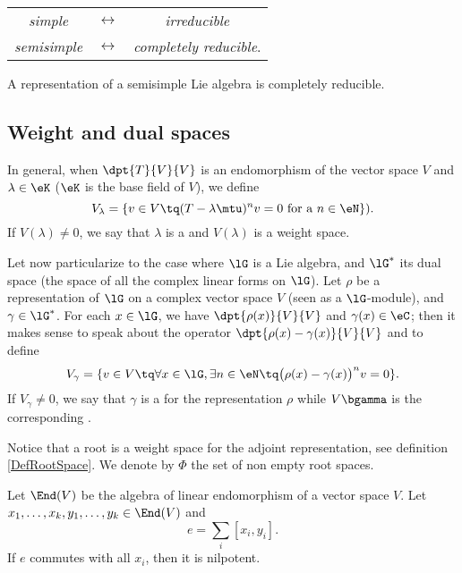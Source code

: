 \begin{center}
\begin{tabular}{ccc}
\emph{simple} & $\leftrightarrow$ & \emph{irreducible} \\ 
\emph{semisimple}& $\leftrightarrow$ &\emph{completely reducible}.\\
\end{tabular} 
\end{center}

\begin{theorem}
A representation of a semisimple Lie algebra is completely reducible.
\end{theorem}

\subsection{Weight and dual spaces}

In general, when $\dpt{T}{V}{V}$ is an endomorphism of the vector space $V$ and $\lambda\in\eK$ ($\eK$ is the base field of $V$), we define
\begin{equation}
V_\lambda=\{ v\in V\tq (T-\lambda\mtu)^nv=0\textrm{ for a $n\in\eN$} \}).
\end{equation}
If $V(\lambda)\neq0$, we say that $\lambda$ is a  and $V(\lambda)$ is a weight space.

Let now particularize to the case where $\lG$ is a Lie algebra, and $\lG^*$ its dual space (the space of all the complex linear forms on $\lG$). Let $\rho$ be a representation of $\lG$ on a complex vector space $V$ (seen as a $\lG$-module), and $\gamma\in\lG^*$. For each $x\in\lG$, we have $\dpt{\rho(x)}{V}{V}$ and $\gamma(x)\in\eC$; then it makes sense to speak about the operator $\dpt{\rho(x)-\gamma(x)}{V}{V}$ and to define
\begin{equation}
V_{\gamma}=\{ v\in V\tq\forall x\in\lG,\exists n\in\eN \tq\big(\rho(x)-\gamma(x)\big)^nv=0 \}.
\end{equation}
If $V_{\gamma}\neq 0$, we say that $\gamma$ is a  for the representation $\rho$ while $V\bgamma$ is the corresponding . 

Notice that a root is a weight space for the adjoint representation, see definition \ref{DefRootSpace}. We denote by $\Phi$ the set of non empty root spaces. 

\begin{lemma}

Let $\End(V)$ be the algebra of linear endomorphism of a vector space $V$. Let $x_1,\ldots,x_k,y_1,\ldots,y_k\in\End(V)$ and 
\[
    e=\sum_i[x_i,y_i].
\]
If $e$ commutes with all $x_i$, then it is nilpotent.
\label{lem:EndV_e}
\end{lemma}

